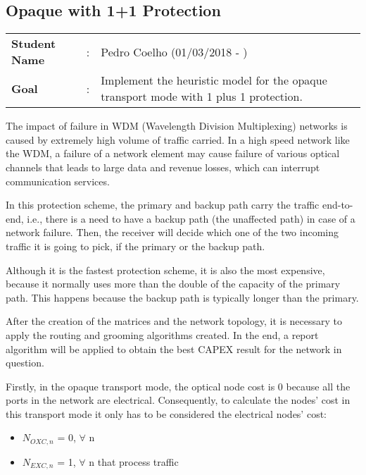 \clearpage

\subsection{Opaque with 1+1 Protection}\label{heuristic_Opaque_Protection}
\begin{tcolorbox}	
\begin{tabular}{p{2.75cm} p{0.2cm} p{10.5cm}} 	
\textbf{Student Name}  &:& Pedro Coelho    (01/03/2018 - )\\
\textbf{Goal}          &:& Implement the heuristic model for the opaque transport mode with 1 plus 1 protection.
\end{tabular}
\end{tcolorbox}

\vspace{11pt}
The impact of failure in WDM (Wavelength Division Multiplexing) networks is caused by extremely high volume of traffic carried. In a high speed network like the WDM, a failure of a network element may cause failure of various optical channels that leads to large data and revenue losses, which can interrupt communication services.

In this protection scheme, the primary and backup path carry the traffic end-to-end, i.e., there is a need to have a backup path (the unaffected path) in case of a network failure. Then, the receiver will decide which one of the two incoming traffic it is going to pick, if the primary or the backup path.

Although it is the fastest protection scheme, it is also the most expensive, because it normally uses more than the double of the capacity of the primary path. This happens because the backup path is typically longer than the primary.

After the creation of the matrices and the network topology, it is necessary to apply the routing and grooming algorithms created. In the end, a report algorithm will be applied to obtain the best CAPEX result for the network in question.

Firstly, in the opaque transport mode, the optical node cost is 0 because all the ports in the network are electrical. Consequently, to calculate the nodes' cost in this transport mode it only has to be considered the electrical nodes' cost:

\begin{itemize}
  \item $N_{OXC,n}$ = 0, \quad $\forall$ n
  \item $N_{EXC,n}$ = 1, \quad $\forall$ n that process traffic
\end{itemize}

